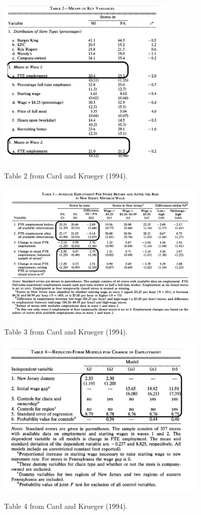 \documentclass[
]{article}
\begin{document}
\begin{table}[!htb]
\centering
  \includegraphics[width=0.63\textwidth]{figures/CardKrueger_Table2.png}
  \caption{Table 2 from Card and Krueger (1994).}
  \label{fig:CK_Tab2}
\end{table}

\newpage
\begin{table}[!htb]
\centering
  \includegraphics[width=0.75\textwidth]{figures/CardKrueger_Table3.png}
  \caption{Table 3 from Card and Krueger (1994).}
  \label{fig:CK_Tab3}
\end{table}

\begin{table}[!htb]
\centering
  \includegraphics[width=0.75\textwidth]{figures/CardKrueger_Table4.png}
  \caption{Table 4 from Card and Krueger (1994).}
  \label{fig:CK_Tab4}
\end{table}
\end{document}
